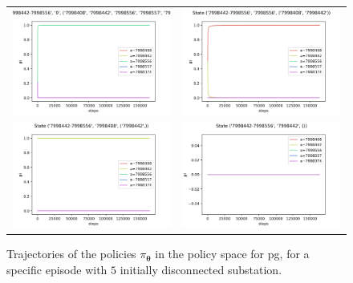 \begin{figure}[!htp]
    \centering
    \begin{tabular}{cc}
        \includegraphics[height=0.27\textwidth,valign=b]{chapters/figures/policy_PG_state_0.png} &
        \includegraphics[height=0.27\textwidth,valign=b]{chapters/figures/policy_PG_state_1.png} \\
        \includegraphics[height=0.27\textwidth,valign=b]{chapters/figures/policy_PG_state_2.png} &
        \includegraphics[height=0.27\textwidth,valign=b]{chapters/figures/policy_PG_state_3.png}
    \end{tabular}
    \caption{Trajectories of the policies $\pi_{\boldsymbol \theta}$ in the policy space for \acrshort{pg}, for a specific episode with $5$ initially disconnected substation.}
    \label{fig:sequence-policies-pg}
\end{figure}

